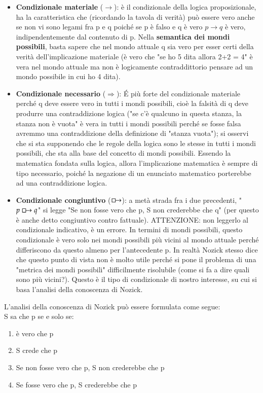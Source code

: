 \documentclass[10pt,a4paper]{article}
\begin{document}
\begin{itemize}
	\item \textbf{Condizionale materiale} ($\rightarrow$): è il condizionale della logica proposizionale, ha la caratteristica che (ricordando la tavola di verità) può essere vero anche se non vi sono legami fra p e q poiché se p è falso e q è vero \(p\rightarrow q\) è vero, indipendentemente dal contenuto di p. Nella \textbf{semantica dei mondi possibili}, basta sapere che nel mondo attuale q sia vero per esser certi della verità dell'implicazione materiale (è vero che "se ho 5 dita allora 2+2 = 4" è vera nel mondo attuale ma non è logicamente contraddittorio pensare ad un mondo possibile in cui ho 4 dita).
	\item \textbf{Condizionale necessario} ($\Rightarrow$): \'E più forte del condizionale materiale perché q deve essere vero in tutti i mondi possibili, cioè la falsità di q deve produrre una contraddizione logica ("se c'è qualcuno in questa stanza, la stanza non è vuota" è vera in tutti i mondi possibili perché se fosse falsa avremmo una contraddizione della definizione di "stanza vuota"); si osservi che si sta supponendo che le regole della logica sono le stesse in tutti i mondi possibili, che sta alla base del concetto di mondi possibili. Essendo la matematica fondata sulla logica, allora l'implicazione matematica è sempre di tipo necessario, poiché la negazione di un enunciato matematico porterebbe ad una contraddizione logica.
	\item \textbf{Condizionale congiuntivo} ($\boxright$): a metà strada fra i due precedenti, "\(p\boxright q\)" si legge "Se non fosse vero che p, S non crederebbe che q" (per questo è anche detto congiuntivo contro fattuale). ATTENZIONE: non leggerlo al condizionale indicativo, è un errore. In termini di mondi possibili, questo condizionale è vero solo nei mondi possibili più vicini al mondo attuale perché differiscono da questo almeno per l'antecedente p. In realtà Nozick stesso dice che questo punto di vista non è molto utile perché si pone il problema di una "metrica dei mondi possibili" difficilmente risolubile (come si fa a dire quali sono più vicini?). Questo è il tipo di condizionale di nostro interesse, su cui si basa l'analisi della conoscenza di Nozick. 
\end{itemize}
L'analisi della conoscenza di Nozick può essere formulata come segue:\\
S sa che p se e solo se:\\
\begin{enumerate}
	\item è vero che p
	\item S crede che p
	\item Se non fosse vero che p, S non crederebbe che p
	\item Se fosse vero che p, S crederebbe che p
\end{enumerate}
\end{document}
